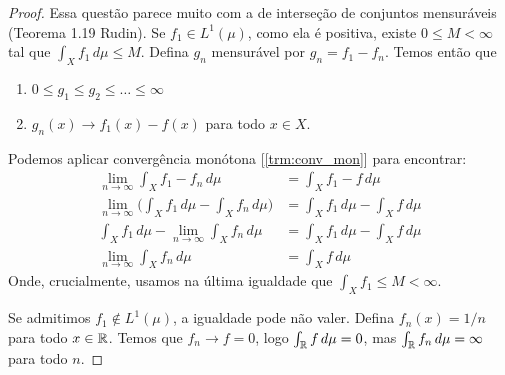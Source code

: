 \begin{problem}
    \label{prob:l2:1}
\end{problem}

\begin{proof}
    
    Essa questão parece muito com a de interseção de conjuntos mensuráveis (Teorema 1.19
    Rudin). Se $f_1 \in L^1(\mu)$, como ela é positiva, existe $0 \leq M < \infty$ tal que $\int_X f_1 \, d\mu \leq M$. Defina $g_n$ mensurável por $g_n = f_1 - f_n$. Temos então que
    \begin{enumerate}[label=(\alph*)]
        \item $0 \leq g_1 \leq g_2 \leq \dots \leq \infty$
        \item $g_n(x) \to f_1(x) - f(x)$ para todo $x \in X$.
    \end{enumerate}
    Podemos aplicar convergência monótona [\ref{trm:conv_mon}] para encontrar:
    \begin{align}
    \lim_{n\to\infty} \int_X f_1 - f_n \, d\mu &= \int_X f_1 - f \, d\mu \\
    \lim_{n\to\infty} \bigg(\int_X f_1\,d\mu  - \int_X f_n \, d\mu\bigg) &= \int_X f_1\,d\mu  - \int_Xf \, d\mu \\
    \int_X f_1\,d\mu - \lim_{n\to\infty} \int_X f_n \, d\mu&= \int_X f_1\,d\mu  - \int_Xf \, d\mu \\
    \lim_{n\to\infty} \int_X f_n \, d\mu & = \int_Xf \, d\mu
    \end{align}
    Onde, crucialmente, usamos na última igualdade que $\int_X f_1 \leq M < \infty$.

    Se admitimos $f_1 \not \in L^1(\mu)$, a igualdade pode não valer. Defina $f_n(x) = 1/n$ para todo $x \in \mathbb{R}$.
    Temos que $f_n \to f = 0$, logo $\int_{\mathbb{R}} f\,d\mu = 0$, mas $\int_{\mathbb{R}} f_n\,d\mu = \infty$ para todo $n$.
\end{proof}

